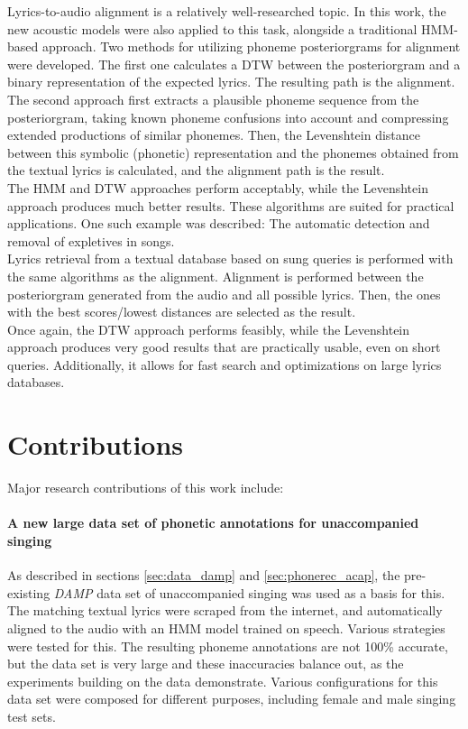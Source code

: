 Lyrics-to-audio alignment is a relatively well-researched topic. In this work, the new acoustic models were also applied to this task, alongside a traditional HMM-based approach. Two methods for utilizing phoneme posteriorgrams for alignment were developed. The first one calculates a DTW between the posteriorgram and a binary representation of the expected lyrics. The resulting path is the alignment. The second approach first extracts a plausible phoneme sequence from the posteriorgram, taking known phoneme confusions into account and compressing extended productions of similar phonemes. Then, the Levenshtein distance between this symbolic (phonetic) representation and the phonemes obtained from the textual lyrics is calculated, and the alignment path is the result.\\
The HMM and DTW approaches perform acceptably, while the Levenshtein approach produces much better results. These algorithms are suited for practical applications. One such example was described: The automatic detection and removal of expletives in songs.\\

Lyrics retrieval from a textual database based on sung queries is performed with the same algorithms as the alignment. Alignment is performed between the posteriorgram generated from the audio and all possible lyrics. Then, the ones with the best scores/lowest distances are selected as the result.\\
Once again, the DTW approach performs feasibly, while the Levenshtein approach produces very good results that are practically usable, even on short queries. Additionally, it allows for fast search and optimizations on large lyrics databases.

\section{Contributions}


Major research contributions of this work include:

\paragraph{A new large data set of phonetic annotations for unaccompanied singing}
As described in sections \ref{sec:data_damp} and \ref{sec:phonerec_acap}, the pre-existing \textit{DAMP} data set of unaccompanied singing was used as a basis for this. The matching textual lyrics were scraped from the internet, and automatically aligned to the audio with an HMM model trained on speech. Various strategies were tested for this. The resulting phoneme annotations are not 100\% accurate, but the data set is very large and these inaccuracies balance out, as the experiments building on the data demonstrate. Various configurations for this data set were composed for different purposes, including female and male singing test sets.


